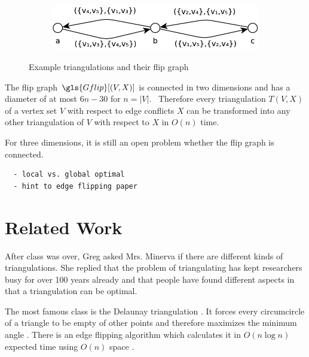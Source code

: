 \begin{figure}[ht]
  \vspace{2em}
  \begin{subfigure}{0.7\textwidth}
    \centering
    \includegraphics[width=\textwidth]{img/example_flip_graph.pdf}
  \end{subfigure}
  \caption{Example triangulations and their flip graph}
\end{figure}


\begin{theorem}
  The flip graph \(\gls{Gflip}[(V,X)]\) is connected in two dimensions
  \cite[Behauptung 4]{flip_graph_connected} and has a diameter of
  at most \(6n - 30\) for \(n = |V|\).~\cite{flip_graph_diameter}
  Therefore every triangulation \(T(V,X)\) of a vertex set \(V\)
  with respect to edge conflicts \(X\) can be transformed into any
  other triangulation of \(V\) with respect to \(X\) in \(O(n)\)
  time.
  
  For three dimensions, it is still an open problem whether
  the flip graph is connected.~\cite{flip_graph_3d}
\end{theorem}

\begin{verbatim}
  - local vs. global optimal
  - hint to edge flipping paper
\end{verbatim}


\section{Related Work}
After class was over, Greg asked Mrs. Minerva if there are different
kinds of triangulations. She replied that the problem of 
triangulating has kept researchers busy for over 100 years already
\cite{triangulation_hilbert} and that people have found different
aspects in that a triangulation can be optimal.

The most famous class is the Delaunay triangulation
\cite[Section 9.2]{deberg_compgeom}. It forces every circumcircle
of a triangle to be empty of other points and therefore maximizes
the minimum angle \cite[Theorem 9.9]{deberg_compgeom}. There is an
edge flipping algorithm which calculates it in \(O(n \log n)\) 
expected time using \(O(n)\) space 
\cite[Theorem 9.12]{deberg_compgeom}.

